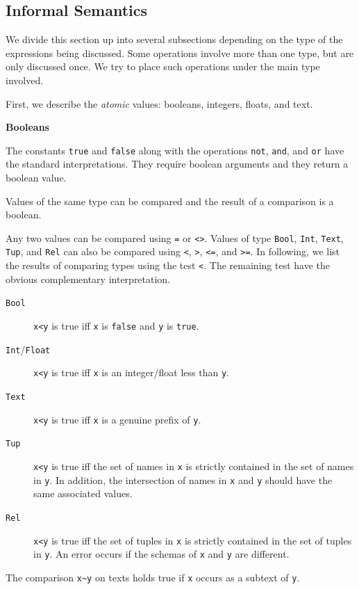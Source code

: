 \documentclass[a4,14pt,latin1]{article}
\begin{document}
\subsection{Informal Semantics}
We divide this section up into several subsections depending on the
type of the expressions being discussed. Some operations involve
more than one type, but are only discussed once. We try to place
such operations under the main type involved.

First, we describe the {\em atomic\/} values: booleans, integers, floats, and text.

\vspace{2ex}
{\bf Booleans}

The constants {\tt true} and {\tt false} along with the operations
{\tt not}, {\tt and}, and {\tt or} have the standard interpretations.
They require boolean arguments and they return a boolean value.

Values of the same type can be compared and the result of a comparison is
a boolean.

Any two values can be compared using {\tt =} or {\tt <>}.
Values of type {\tt Bool}, {\tt Int}, {\tt Text}, {\tt Tup}, and
{\tt Rel} can also be compared using {\tt <}, {\tt >}, {\tt <=}, and {\tt >=}.
In following, we list the results of comparing types using the test {\tt <}.
The remaining test have the obvious complementary interpretation.
\begin{description}%
\item[{\tt Bool}]
{\tt x<y} is true iff {\tt x} is {\tt false} and {\tt y} is {\tt true}.
\item[{\tt Int}/{\tt Float}]
{\tt x<y} is true iff {\tt x} is an integer/float less than {\tt y}.
\item[{\tt Text}]
{\tt x<y} is true iff {\tt x} is a genuine prefix of {\tt y}.
\item[{\tt Tup}]
{\tt x<y} is true iff the set of names in {\tt x} is strictly contained in the
set of names in {\tt y}. In addition, the intersection of names in {\tt x}
and {\tt y} should have the same associated values.
\item[{\tt Rel}]
{\tt x<y} is true iff the set of tuples in {\tt x} is strictly contained
in the set of tuples in {\tt y}. An error occurs if the schemas of
{\tt x} and {\tt y} are different.
\end{description}
The comparison \verb"x~y" on texts holds true if \verb"x" occurs as
a subtext of \verb"y".
\end{document}
